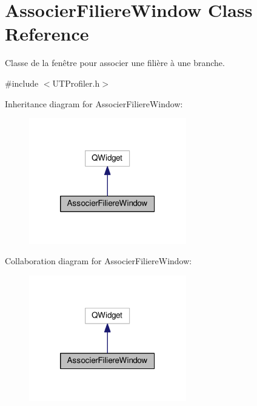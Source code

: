 \hypertarget{class_associer_filiere_window}{\section{Associer\-Filiere\-Window Class Reference}
\label{class_associer_filiere_window}
}


Classe de la fenêtre pour associer une filière à une branche.  




{\ttfamily \#include $<$U\-T\-Profiler.\-h$>$}



Inheritance diagram for Associer\-Filiere\-Window\-:
\nopagebreak
\begin{figure}[H]
\begin{center}
\leavevmode
\includegraphics[width=194pt]{class_associer_filiere_window__inherit__graph}
\end{center}
\end{figure}


Collaboration diagram for Associer\-Filiere\-Window\-:
\nopagebreak
\begin{figure}[H]
\begin{center}
\leavevmode
\includegraphics[width=194pt]{class_associer_filiere_window__coll__graph}
\end{center}
\end{figure}
